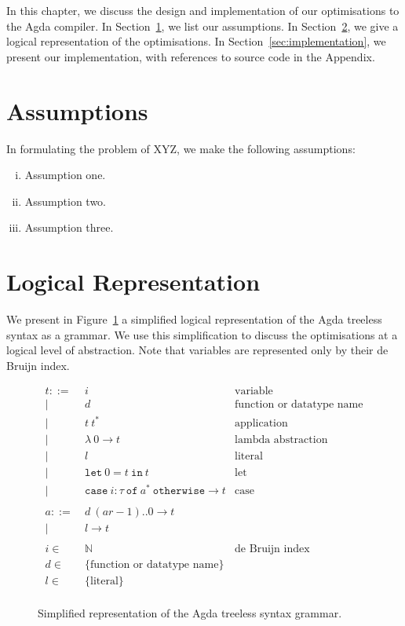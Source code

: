 In this chapter, we discuss the design and implementation of our optimisations to the Agda compiler. In Section~\ref{sec:assumptions}, we list our assumptions. In Section~\ref{sec:logical_representation}, we give a logical representation of the optimisations. In Section~\ref{sec:implementation}, we present our implementation, with references to source code in the Appendix.

\section{Assumptions}
\label{sec:assumptions}

In formulating the problem of XYZ, we make the following assumptions: 
\begin{enumerate}[(i)]
	\item Assumption one. 
	\item Assumption two. 
	\item Assumption three. 
\end{enumerate}


\section{Logical Representation}
\label{sec:logical_representation}

We present in Figure~\ref{fig:treeless_grammar} a simplified logical representation of the Agda treeless syntax as a grammar. We use this simplification to discuss the optimisations at a logical level of abstraction. Note that variables are represented only by their de Bruijn index.

\begin{figure}
\begin{align*}
t ::=~& i & \text{variable}\\
|~& d & \text{function or datatype name}\\
|~& t~t^* & \text{application}\\
|~& \lambda~0 \to t & \text{lambda abstraction}\\
|~& l & \text{literal}\\
|~& \mathtt{let}~0 = t~\mathtt{in}~t & \text{let}\\
|~& \mathtt{case}~i : \tau~\mathtt{of}~a^*~\mathtt{otherwise} \to t& \text{case}\\
\\
a ::=~& d~(ar-1)..0 \to t\\
|~& l \to t\\
\\
i \in~& \mathbb{N} & \text{de Bruijn index}\\
d \in~& \{\text{function or datatype name}\}\\
l \in~& \{\text{literal}\}\\
\end{align*}
\caption{Simplified representation of the Agda treeless syntax grammar.}
\label{fig:treeless_grammar}
\end{figure}

